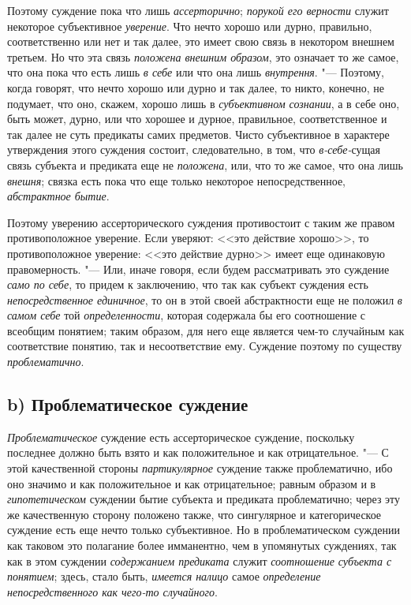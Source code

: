 Поэтому суждение пока что лишь
{\em ассерторично};
{\em порукой его верности
}служит некоторое субъективное
{\em уверение}. Что нечто
хорошо или дурно, правильно, соответственно или нет и так далее, это имеет
свою связь в некотором внешнем третьем. Но что эта связь
{\em положена внешним образом},
это означает то же самое, что она пока что есть лишь
{\em в себе} или что она
лишь {\em внутрення}. "---
Поэтому, когда говорят, что нечто хорошо или дурно и так
далее, то никто, конечно, не подумает, что оно, скажем, хорошо лишь в
{\em субъективном сознании},
а в себе оно, быть может, дурно, или что хорошее и дурное,
правильное, соответственное и так далее не суть предикаты самих предметов.
Чисто субъективное в характере утверждения этого суждения состоит,
следовательно, в том, что
{\em в-себе-}сущая
связь субъекта и предиката еще не
{\em положена}, или, что
то же самое, что она лишь {\em внешня};
связка есть пока что еще только некоторое непосредственное,
{\em абстрактное бытие}.

Поэтому уверению ассерторического суждения противостоит с
таким же правом противоположное уверение. Если уверяют: <<это действие
хорошо>>, то противоположное уверение: <<это действие дурно>> имеет еще
одинаковую правомерность. "--- Или, иначе говоря, если будем
рассматривать это суждение {\em само по
себе}, то придем к заключению, что так как субъект суждения
есть {\em непосредственное единичное},
то он в этой своей абстрактности еще не положил
{\em в самом себе} той
{\em определенности},
которая содержала бы его соотношение с всеобщим понятием;
таким образом, для него еще является чем-то случайным как соответствие
понятию, так и несоответствие ему. Суждение поэтому по существу
{\em проблематично}.

\subsection[b) Проблематическое суждение]{b) Проблематическое суждение}
{\em Проблематическое}
суждение есть ассерторическое суждение, поскольку последнее
должно быть взято и как положительное и как отрицательное. "---
С этой качественной стороны
{\em партикулярное}
суждение также проблематично, ибо оно значимо и как
положительное и как отрицательное; равным образом и в
{\em гипотетическом}
суждении бытие субъекта и предиката проблематично; через эту
же качественную сторону положено также, что сингулярное и категорическое
суждение есть еще нечто только субъективное. Но в проблематическом суждении
как таковом это полагание более имманентно, чем в упомянутых суждениях, так
как в этом суждении {\em содержанием
предиката} служит
{\em соотношение
}{\em субъекта с понятием};
здесь, стало быть,
{\em имеется налицо}
самое {\em определение
непосредственного как чего-то случайного}.

